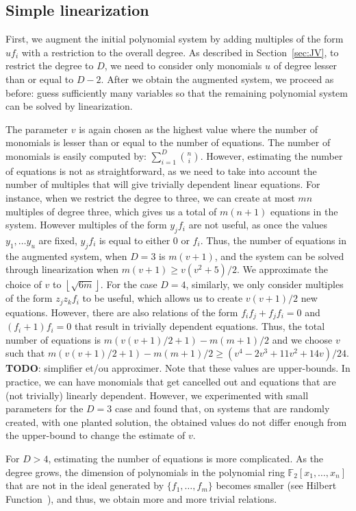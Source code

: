 \documentclass[a4paper,UKenglish,cleveref, autoref]{lipics-v2019}
\newcommand{\red}{\color{red}}
\newcommand{\TODO}[1]{{\red \textbf{TODO}:} #1\xspace}
\begin{document}
\subsection{Simple linearization}

First, we augment the initial polynomial system by adding multiples of the form $uf_i$ with a restriction to the overall degree. As described in Section~\ref{sec:JV}, to restrict the degree to $D$, we need to consider only monomials $u$ of degree lesser than or equal to $D-2$. After we obtain the augmented system, we proceed as before: guess sufficiently many variables so that the remaining polynomial system can be solved by linearization. 

The parameter $v$ is again chosen as the highest value where the number of monomials is lesser than or equal to the number of equations. The number of monomials is easily computed by: $\sum_{i=1}^{D}\binom{n}{i}$. However, estimating the number of equations is not as straightforward, as we need to take into account the number of multiples that will give trivially dependent linear equations. For instance, when we restrict the degree to three, we can create at most $mn$ multiples of degree three, which gives us a total of $m(n+1)$ equations in the system. However multiples of the form $y_jf_i$ are not useful, as once the values $y_1,\dots y_u$ are fixed, $y_jf_i$ is equal to either 0 or $f_i$. Thus, the number of equations in the augmented system, when $D=3$ is $m(v+1)$, and the system can be solved through linearization when $m(v+1) \geq v(v^2+5)/2$. We approximate the choice of $v$ to $\left\lfloor \sqrt{6m} \right\rfloor$. For the case $D=4$, similarly, we only consider multiples of the form $z_jz_kf_i$ to be useful, which allows us to create $v(v+1)/2$ new equations. However, there are also relations of the form $f_if_j + f_jf_i=0$ and $(f_i+1)f_i=0$ that result in trivially dependent equations. Thus, the total number of equations is $m(v(v+1)/2+1)-m(m+1)/2$ and we choose $v$ such that $m(v(v+1)/2+1)-m(m+1)/2 \geq (v^4-2v^3+11v^2+14v)/24$. \TODO{simplifier et/ou approximer}. Note that these values are upper-bounds. In practice, we can have monomials that get cancelled out and equations that are (not trivially) linearly dependent. However, we experimented with small parameters for the $D=3$ case and found that, on systems that are randomly created, with one planted solution, the obtained values do not differ enough from the upper-bound to change the estimate of $v$. 

For $D > 4$, estimating the number of equations is more complicated. As the degree grows, the dimension of polynomials in the polynomial ring $\mathbb{F}_2[x_1, \dots, x_n]$ that are not in the ideal generated by $\{f_1, \dots, f_m\}$ becomes smaller (see Hilbert Function~\cite{Ideals_varieties_algos}), and thus, we obtain more and more trivial relations.
\end{document}
